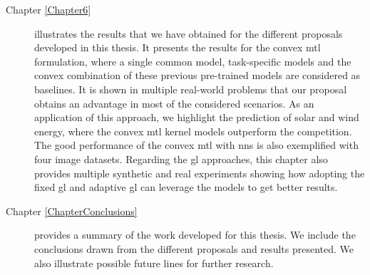 \begin{description}
\item [{ Chapter \ref{Chapter6}}] illustrates the results that we have obtained for the different proposals developed in this thesis. It presents the results for the convex \acrshort{mtl} formulation, where a single common model, task-specific models and the convex combination of these previous pre-trained models are considered as baselines. It is shown in multiple real-world problems that our proposal obtains an advantage in most of the considered scenarios. As an application of this approach, we highlight the prediction of solar and wind energy, where the convex \acrshort{mtl} kernel models outperform the competition. The good performance of the convex \acrshort{mtl} with \acrshort{nns} is also exemplified with four image datasets. Regarding the \acrshort{gl} approaches, this chapter also provides multiple synthetic and real experiments showing how adopting the fixed \acrshort{gl} and adaptive \acrshort{gl} can leverage the models to get better results.



\item [{Chapter \ref{ChapterConclusions}}] provides a summary of the work developed for this thesis. We include the conclusions drawn from the different proposals and results presented. We also illustrate possible future lines for further research.

\end{description}


